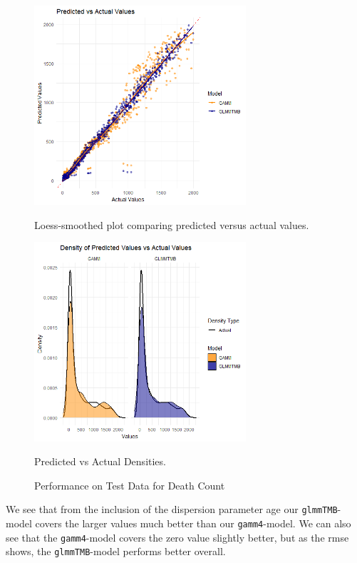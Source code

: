 \documentclass[12pt, twoside,hidelinks]{article}
\theoremstyle{definition}
\numberwithin{equation}{section}
\begin{document}
\begin{figure}[H]
\centering

\includegraphics[width=0.7\textwidth]{visuals/mortalityData/mortpredvact.png}
\caption*{Loess-smoothed plot comparing predicted versus actual values.}
\label{fig:hist_pred_errors}

\includegraphics[width=0.7\textwidth]{visuals/mortalityData/mortdenspredvact.png}
\caption*{Predicted vs Actual Densities.}
\label{fig:predicted_vs_actual_densities}

\caption{Performance on Test Data for Death Count}
\label{fig:test_data_performance_4}
\end{figure}

We see that from the inclusion of the dispersion parameter age our \texttt{glmmTMB}-model covers the larger values much better than our \texttt{gamm4}-model. We can also see that the \texttt{gamm4}-model covers the zero value slightly better, but as the rmse shows, the \texttt{glmmTMB}-model performs better overall.
\end{document}
